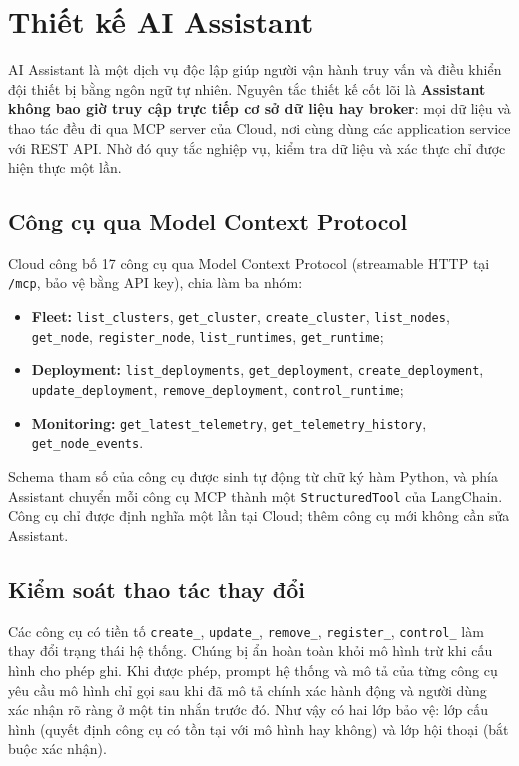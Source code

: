 \section{Thiết kế AI Assistant}

AI Assistant là một dịch vụ độc lập giúp người vận hành truy vấn và điều khiển
đội thiết bị bằng ngôn ngữ tự nhiên. Nguyên tắc thiết kế cốt lõi là \textbf{Assistant
không bao giờ truy cập trực tiếp cơ sở dữ liệu hay broker}: mọi dữ liệu và thao
tác đều đi qua MCP server của Cloud, nơi cùng dùng các application service với
REST API. Nhờ đó quy tắc nghiệp vụ, kiểm tra dữ liệu và xác thực chỉ được hiện
thực một lần.

\subsection{Công cụ qua Model Context Protocol}

Cloud công bố 17 công cụ qua Model Context Protocol \cite{mcp} (streamable HTTP tại \texttt{/mcp}, bảo vệ bằng
API key), chia làm ba nhóm:

\begin{itemize}
  \item \textbf{Fleet:} \texttt{list\_clusters}, \texttt{get\_cluster},
        \texttt{create\_cluster}, \texttt{list\_nodes}, \texttt{get\_node},
        \texttt{register\_node}, \texttt{list\_runtimes}, \texttt{get\_runtime};
  \item \textbf{Deployment:} \texttt{list\_deployments}, \texttt{get\_deployment},
        \texttt{create\_deployment}, \texttt{update\_deployment},
        \texttt{remove\_deployment}, \texttt{control\_runtime};
  \item \textbf{Monitoring:} \texttt{get\_latest\_telemetry},
        \texttt{get\_telemetry\_history}, \texttt{get\_node\_events}.
\end{itemize}

Schema tham số của công cụ được sinh tự động từ chữ ký hàm Python, và phía
Assistant chuyển mỗi công cụ MCP thành một \texttt{StructuredTool} của LangChain.
Công cụ chỉ được định nghĩa một lần tại Cloud; thêm công cụ mới không cần sửa
Assistant.

\subsection{Kiểm soát thao tác thay đổi}

Các công cụ có tiền tố \texttt{create\_}, \texttt{update\_}, \texttt{remove\_},
\texttt{register\_}, \texttt{control\_} làm thay đổi trạng thái hệ thống. Chúng bị
ẩn hoàn toàn khỏi mô hình trừ khi cấu hình cho phép ghi. Khi được phép, prompt hệ
thống và mô tả của từng công cụ yêu cầu mô hình chỉ gọi sau khi đã mô tả chính
xác hành động và người dùng xác nhận rõ ràng ở một tin nhắn trước đó. Như vậy
có hai lớp bảo vệ: lớp cấu hình (quyết định công cụ có tồn tại với mô hình hay
không) và lớp hội thoại (bắt buộc xác nhận).

